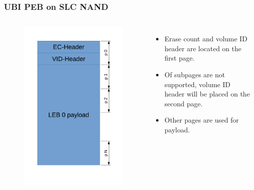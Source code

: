 \documentclass[aspectratio=169,obeyspaces,spaces,hyphens,dvipsnames]{beamer}
\begin{document}
\begin{frame}[fragile]
\frametitle{UBI PEB on SLC NAND}
   \begin{columns}
     \begin{figure}
     \includegraphics[scale=0.40]{ubi_slc.pdf}
     \end{figure}
    \begin{itemize}
    \item Erase count and volume ID header are located on the first page.
    \item Of subpages are not supported, volume ID header will be placed on the second page.
    \item Other pages are used for payload.
    \end{itemize}
   \end{columns}
\end{frame}
\end{document}
